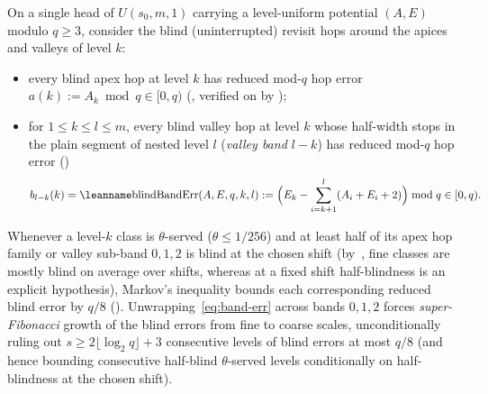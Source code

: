 On a single head of $U(s_0, m, 1)$ carrying a level-uniform potential $(A, E)$ modulo $q \ge 3$, consider the blind
(uninterrupted) revisit hops around the apices and valleys of level $k$:
\begin{itemize}
\item every blind apex hop at level $k$ has reduced mod-$q$ hop error $a(k) := A_k \bmod q \in [0, q)$
  (, verified on  by );
\item for $1 \le k \le l \le m$, every blind valley hop at level $k$ whose half-width stops in the plain segment of nested
  level $l$ (\emph{valley band $l - k$}) has reduced mod-$q$ hop error ()
  \begin{equation}\label{eq:band-err}
    b_{l - k}(k) = \lean{blindBandErr}(A, E, q, k, l) :=
    \Bigl(E_k - \sum_{i = k + 1}^l (A_i + E_i + 2)\Bigr) \bmod q \in [0, q).
  \end{equation}
\end{itemize}
Whenever a level-$k$ class is $\theta$-served ($\theta \le 1/256$) and at least half of its apex hop family or valley
sub-band $0, 1, 2$ is blind at the chosen shift (by~\cite[Proposition~5.17 and Corollary~5.18]{EighthPaper2026}, fine
classes are mostly blind on average over shifts, whereas at a fixed shift half-blindness is an explicit hypothesis),
Markov's inequality bounds each corresponding reduced blind error by $q / 8$ ().
Unwrapping~\eqref{eq:band-err} across bands $0, 1, 2$ forces \emph{super-Fibonacci} growth of the blind errors from fine to
coarse scales, unconditionally ruling out $s \ge 2\lfloor\log_2 q\rfloor + 3$ consecutive levels of blind errors at most
$q/8$ (and hence bounding consecutive half-blind $\theta$-served levels conditionally on half-blindness at the chosen shift).

